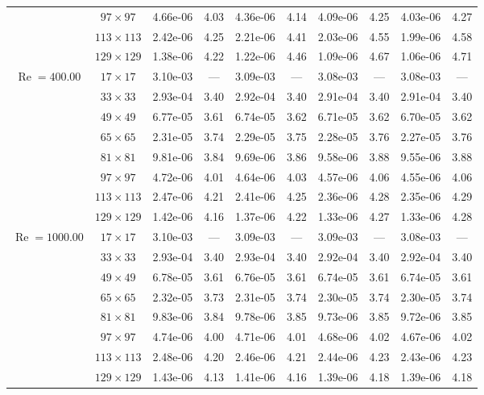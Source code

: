 \documentclass[preprint, 12pt]{elsarticle}
\begin{document}
{\begin{center}
\begin{table}[H]
{\begin{tabular*}{\textwidth}{@{\extracolsep\fill}cccccccccc@{}}
& $97\times 97$ & 4.66e-06 & 4.03 & 4.36e-06 & 4.14 & 4.09e-06 & 4.25 & 4.03e-06 & 4.27 \\
& $113\times 113$ & 2.42e-06 & 4.25 & 2.21e-06 & 4.41 & 2.03e-06 & 4.55 & 1.99e-06 & 4.58 \\
& $129\times 129$ & 1.38e-06 & 4.22 & 1.22e-06 & 4.46 & 1.09e-06 & 4.67 & 1.06e-06 & 4.71 \\
    \hline
    \multirow{7}{*}{$\operatorname{Re}=400.00$} & $17\times 17$ & 3.10e-03 & --- & 3.09e-03 & --- & 3.08e-03 & --- & 3.08e-03 & --- \\
& $33\times 33$ & 2.93e-04 & 3.40 & 2.92e-04 & 3.40 & 2.91e-04 & 3.40 & 2.91e-04 & 3.40 \\
& $49\times 49$ & 6.77e-05 & 3.61 & 6.74e-05 & 3.62 & 6.71e-05 & 3.62 & 6.70e-05 & 3.62 \\
\multirow{3}{*}{$\operatorname{Wi}=10$} & $65\times 65$ & 2.31e-05 & 3.74 & 2.29e-05 & 3.75 & 2.28e-05 & 3.76 & 2.27e-05 & 3.76 \\
& $81\times 81$ & 9.81e-06 & 3.84 & 9.69e-06 & 3.86 & 9.58e-06 & 3.88 & 9.55e-06 & 3.88 \\
& $97\times 97$ & 4.72e-06 & 4.01 & 4.64e-06 & 4.03 & 4.57e-06 & 4.06 & 4.55e-06 & 4.06 \\
& $113\times 113$ & 2.47e-06 & 4.21 & 2.41e-06 & 4.25 & 2.36e-06 & 4.28 & 2.35e-06 & 4.29 \\
& $129\times 129$ & 1.42e-06 & 4.16 & 1.37e-06 & 4.22 & 1.33e-06 & 4.27 & 1.33e-06 & 4.28 \\
    \hline
    \multirow{7}{*}{$\operatorname{Re}=1000.00$} & $17\times 17$ & 3.10e-03 & --- & 3.09e-03 & --- & 3.09e-03 & --- & 3.08e-03 & --- \\
& $33\times 33$ & 2.93e-04 & 3.40 & 2.93e-04 & 3.40 & 2.92e-04 & 3.40 & 2.92e-04 & 3.40 \\
& $49\times 49$ & 6.78e-05 & 3.61 & 6.76e-05 & 3.61 & 6.74e-05 & 3.61 & 6.74e-05 & 3.61 \\
\multirow{3}{*}{$\operatorname{Wi}=10$} & $65\times 65$ & 2.32e-05 & 3.73 & 2.31e-05 & 3.74 & 2.30e-05 & 3.74 & 2.30e-05 & 3.74 \\
& $81\times 81$ & 9.83e-06 & 3.84 & 9.78e-06 & 3.85 & 9.73e-06 & 3.85 & 9.72e-06 & 3.85 \\
& $97\times 97$ & 4.74e-06 & 4.00 & 4.71e-06 & 4.01 & 4.68e-06 & 4.02 & 4.67e-06 & 4.02 \\
& $113\times 113$ & 2.48e-06 & 4.20 & 2.46e-06 & 4.21 & 2.44e-06 & 4.23 & 2.43e-06 & 4.23 \\
& $129\times 129$ & 1.43e-06 & 4.13 & 1.41e-06 & 4.16 & 1.39e-06 & 4.18 & 1.39e-06 & 4.18 \\
    \hline
    \end{tabular*}
}
\end{table}
\end{center}

}
\end{document}
